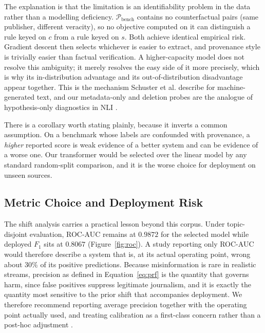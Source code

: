 \documentclass[conference]{IEEEtran}
\newcommand{\Fone}{$F_1$}
\begin{document}
The explanation is that the limitation is an identifiability problem in the data
rather than a modelling deficiency. $\mathcal{P}_{\text{bench}}$ contains no
counterfactual pairs (same publisher, different veracity), so no objective
computed on it can distinguish a rule keyed on $c$ from a rule keyed on $s$.
Both achieve identical empirical risk. Gradient descent then selects whichever is
easier to extract, and provenance style is trivially easier than factual
verification. A higher-capacity model does not resolve this ambiguity; it merely
resolves the easy side of it more precisely, which is why its
in-distribution advantage and its out-of-distribution disadvantage appear
together. This is the mechanism Schuster et al.
\cite{schuster2020limitations} describe for machine-generated text, and our
metadata-only and deletion probes are the analogue of hypothesis-only
diagnostics in NLI \cite{gururangan2018annotation,poliak2018hypothesis}.

There is a corollary worth stating plainly, because it inverts a common
assumption. On a benchmark whose labels are confounded with provenance, a
\emph{higher} reported score is weak evidence of a better system and can be
evidence of a worse one. Our transformer would be selected over the linear model
by any standard random-split comparison, and it is the worse choice for
deployment on unseen sources.

\subsection{Metric Choice and Deployment Risk}
The shift analysis carries a practical lesson beyond this corpus. Under
topic-disjoint evaluation, ROC-AUC remains at $0.9872$ for the selected model
while deployed \Fone{} sits at $0.8067$ (Figure~\ref{fig:roc}). A study
reporting only ROC-AUC would therefore describe a system that is, at its actual
operating point, wrong about $30\%$ of its positive predictions. Because
misinformation is rare in realistic streams, precision as defined in
Equation~\eqref{eq:prf} is the quantity that governs harm, since false positives
suppress legitimate journalism, and it is exactly the quantity most sensitive to
the prior shift that accompanies deployment. We therefore recommend reporting average precision
together with the operating point actually used, and treating calibration as a
first-class concern rather than a post-hoc adjustment
\cite{platt1999probabilistic,niculescu2005predicting,guo2017calibration}.
\end{document}
